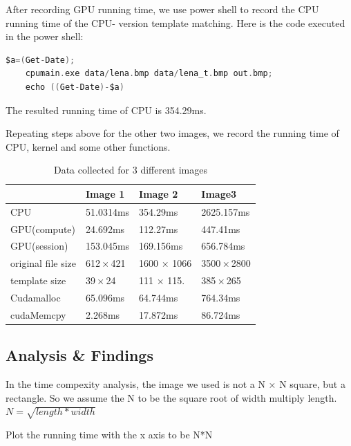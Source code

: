 \documentclass[12pt, a4paper]{article}
\begin{document}
After recording GPU running time, we use power shell to record the CPU running time of the CPU-
version template matching. Here is the code executed in the power shell:
      \begin{lstlisting}[language=c]
	$a=(Get-Date);
	cpumain.exe data/lena.bmp data/lena_t.bmp out.bmp;
	echo ((Get-Date)-$a)
      \end{lstlisting}
The resulted running time of CPU is 354.29ms.



Repeating steps above for the other two images, we record the running time of CPU, kernel and some other functions.

\begin{table}[!htbp]
\caption{Data collected for 3 different images}
\begin{tabular*}{12cm}{llll}
\hline
& Image 1 & Image 2 & Image3\\
\hline    
  CPU     & 51.0314ms&	354.29ms &	2625.157ms\\
  GPU(compute)      	&24.692ms 	&112.27ms 	&447.41ms \\ 
  GPU(session)      	&153.045ms	&169.156ms &	656.784ms \\
  original file size	&612 × 421&1600 × 1066&   3500 × 2800     \\ 	         	          
  template size     	&39 × 24&  111 × 115.&  385 × 265      	      \\   	          
  Cudamalloc        &	65.096ms 	&64.744ms &764.34ms  \\
  cudaMemcpy      &  	2.268ms  &	17.872ms 	& 86.724ms  \\

\hline
\end{tabular*}
\end{table}

  \subsection{Analysis \& Findings}
  
  In the time compexity analysis, the image we used is not a N × N square, but a rectangle. So we 
  assume the N to be the square root of width multiply length. $N=\sqrt{length * width}$
 
 Plot the running time with the x axis to be N*N
 
\end{document}

